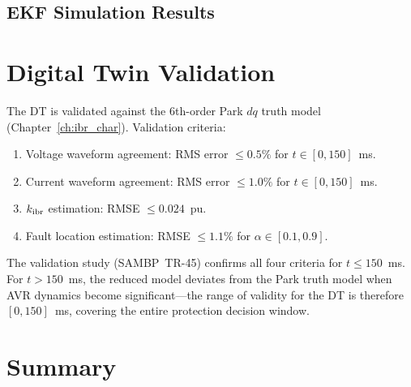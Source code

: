 \subsection{EKF Simulation Results}


\section{Digital Twin Validation}
\label{sec:ch7_validation}

The DT is validated against the 6th-order Park $dq$ truth model
(Chapter~\ref{ch:ibr_char}). Validation criteria:
\begin{enumerate}
\item Voltage waveform agreement: RMS error $\leq 0.5\%$ for $t \in [0, 150]$~ms.
\item Current waveform agreement: RMS error $\leq 1.0\%$ for $t \in [0, 150]$~ms.
\item $k_\mathrm{ibr}$ estimation: RMSE $\leq 0.024$~pu.
\item Fault location estimation: RMSE $\leq 1.1\%$ for $\alpha \in [0.1, 0.9]$.
\end{enumerate}

The validation study (SAMBP~TR-45) confirms all four criteria for
$t \leq 150$~ms. For $t > 150$~ms, the reduced model deviates from the
Park truth model when AVR dynamics become significant—the range of
validity for the DT is therefore $[0, 150]$~ms, covering the entire
protection decision window.

\section{Summary}
\label{sec:ch7_summary}

